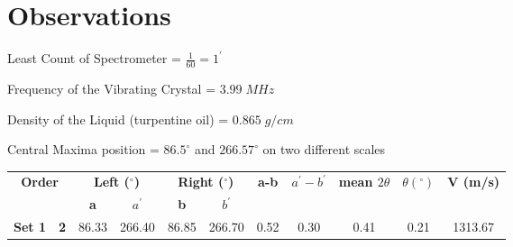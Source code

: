 
\section{Observations}

Least Count of Spectrometer = $\frac{1}{60} = 1^{'}$

Frequency of the Vibrating Crystal = $3.99\;MHz$

Density of the Liquid (turpentine oil) = $0.865\;g/cm$

Central Maxima position = $86.5^\circ$ and $266.57^\circ$ on two different scales

\begin{table}[]
	\centering
	\begin{tabular}{|cc|cc|cc|c|c|c|c|c|}
		\hline
		\multicolumn{2}{|c|}{\multirow{2}{*}{\textbf{Order}}} &
		\multicolumn{2}{c|}{\textbf{Left ($^\circ$)}}         &
		\multicolumn{2}{c|}{\textbf{Right ($^\circ$)}}        &
		\multirow{2}{*}{\textbf{a-b}}                         &
		\multirow{2}{*}{\textbf{$a^{'}-b^{'}$}}               &
		\multirow{2}{*}{\textbf{mean $2\theta$}}              &
		\multirow{2}{*}{\textbf{$\theta (^\circ)$}}           &
		\multirow{2}{*}{\textbf{V (m/s)}}                     \\ \cline{3-6}
		\multicolumn{2}{|c|}{}                                &
		\multicolumn{1}{c|}{\textbf{a}}                       &
		\textbf{$a^{'}$}                                      &
		\multicolumn{1}{c|}{\textbf{b}}                       &
		\textbf{$b^{'}$}                                      &
		                                                      &
		                                                      &
		                                                      &
		                                                      &
		\\ \hline
		\multicolumn{1}{|c|}{\multirow{2}{*}{\textbf{Set 1}}} &
		\textbf{2}                                            &
		\multicolumn{1}{c|}{86.33}                            &
		266.40                                                &
		\multicolumn{1}{c|}{86.85}                            &
		266.70                                                &
		0.52                                                  &
		0.30                                                  &
		0.41                                                  &
		0.21                                                  &
		1313.67                                                 \\ \cline{2-11}

\end{tabular}
\end{table}
